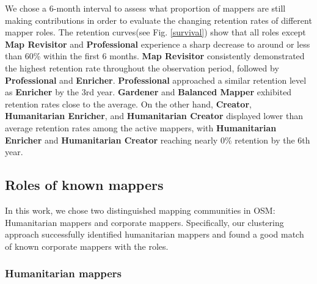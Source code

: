 \documentclass[manuscript,screen,review]{acmart}
\begin{document}
We chose a 6-month interval to assess what proportion of mappers are still making contributions in order to evaluate the changing retention rates of different mapper roles. The retention curves(see Fig. \ref{survival}) show that all roles except \textbf{Map Revisitor} and \textbf{Professional} experience a sharp decrease to around or less than 60\% within the first 6 months. \textbf{Map Revisitor} consistently demonstrated the highest retention rate throughout the observation period, followed by \textbf{Professional} and \textbf{Enricher}.  \textbf{Professional} approached a similar retention level as \textbf{Enricher} by the 3rd year. \textbf{Gardener} and \textbf{Balanced Mapper} exhibited retention rates close to the average. On the other hand, \textbf{Creator}, \textbf{Humanitarian Enricher}, and \textbf{Humanitarian Creator} displayed lower than average retention rates among the active mappers, with \textbf{Humanitarian Enricher} and \textbf{Humanitarian Creator} reaching nearly 0\% retention by the 6th year. 

\subsection{Roles of known mappers} \label{known mappers}

In this work, we chose two distinguished mapping communities in OSM: Humanitarian mappers and corporate mappers. Specifically, our clustering approach successfully identified humanitarian mappers and found a good match of known corporate mappers with the roles.

\subsubsection{Humanitarian mappers}
\end{document}
